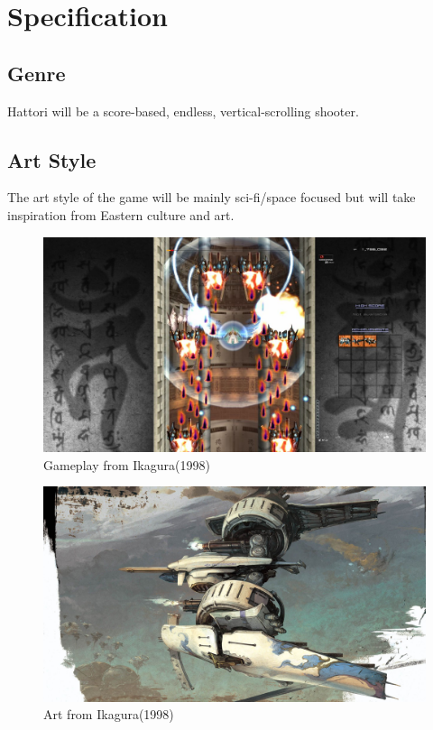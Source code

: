 \documentclass[a4paper]{scrreprt}
\begin{document}
\chapter{Specification}

\section{Genre}
Hattori will be a score-based, endless, vertical-scrolling shooter.


\section{Art Style}
The art style of the game will be mainly sci-fi/space focused but will take inspiration from Eastern culture and art. 
\begin{figure}[h!]
\centering
\includegraphics[width=1\textwidth]{IkaguraGameplay}
\caption{\label{fig:art}Gameplay from Ikagura(1998)}
\end{figure}
  

\begin{figure}[h!]
\centering
\includegraphics[width=1\textwidth]{Ikagura}
\caption{\label{fig:art}Art from Ikagura(1998)}
\end{figure}
\end{document}
